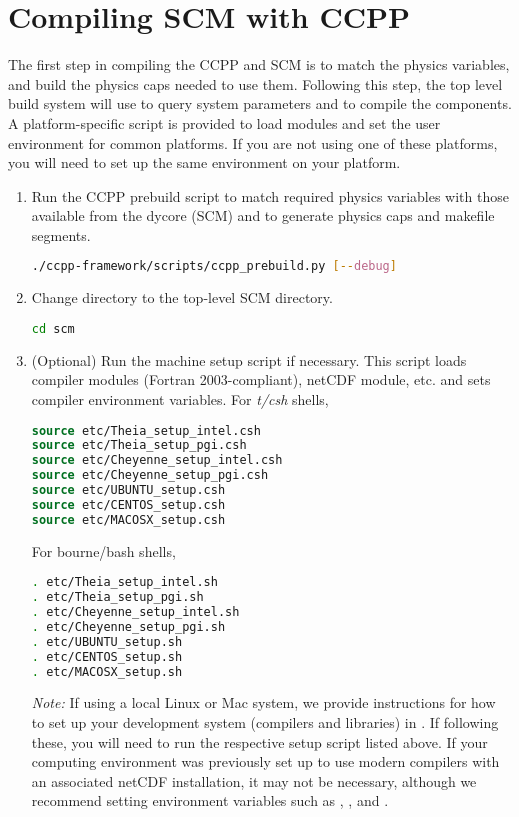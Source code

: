 \section{Compiling SCM with CCPP}
\label{section: compiling}
The first step in compiling the CCPP and SCM is to match the physics variables, and build the physics caps needed to use them.  Following this step, the top level build system will use  to query system parameters and  to compile the components.  A platform-specific script is provided to load modules and set the user environment for common platforms.  If you are not using one of these platforms, you will need to set up the same environment on your platform.
\begin{enumerate}
    \item Run the CCPP prebuild script to match required physics variables with those available from the dycore (SCM) and to generate physics caps and makefile segments.
\begin{lstlisting}[language=bash]
./ccpp-framework/scripts/ccpp_prebuild.py [--debug]
\end{lstlisting}
    \item Change directory to the top-level SCM directory.
\begin{lstlisting}[language=bash]
cd scm
\end{lstlisting}
    \item (Optional) Run the machine setup script if necessary. This script loads compiler modules (Fortran 2003-compliant), netCDF module, etc. and sets compiler environment variables. For \textit{t/csh} shells,
\begin{lstlisting}[language=csh]
source etc/Theia_setup_intel.csh
source etc/Theia_setup_pgi.csh
source etc/Cheyenne_setup_intel.csh
source etc/Cheyenne_setup_pgi.csh
source etc/UBUNTU_setup.csh
source etc/CENTOS_setup.csh
source etc/MACOSX_setup.csh
\end{lstlisting}
For bourne/bash shells,
\begin{lstlisting}[language=bash]
. etc/Theia_setup_intel.sh
. etc/Theia_setup_pgi.sh
. etc/Cheyenne_setup_intel.sh
. etc/Cheyenne_setup_pgi.sh
. etc/UBUNTU_setup.sh
. etc/CENTOS_setup.sh
. etc/MACOSX_setup.sh
\end{lstlisting}
\emph{Note:} If using a local Linux or Mac system, we provide instructions for how to set up your development system (compilers and libraries) in . If following these, you will need to run the respective setup script listed above. If your computing environment was previously set up to use modern compilers with an associated netCDF installation, it may not be necessary, although we recommend setting environment variables such as , , and .


\end{enumerate}
